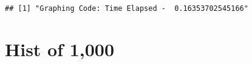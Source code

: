 \documentclass[
]{article}
\newenvironment{Shaded}{\begin{snugshade}}{\end{snugshade}}
\newcommand{\NormalTok}[1]{#1}
\newcommand{\OtherTok}[1]{\textcolor[rgb]{0.56,0.35,0.01}{#1}}
\newcommand{\SpecialCharTok}[1]{\textcolor[rgb]{0.81,0.36,0.00}{\textbf{#1}}}
\begin{document}
\begin{verbatim}
## [1] "Graphing Code: Time Elapsed -  0.16353702545166"
\end{verbatim}

\section{Hist of 1,000}\label{hist-of-1000}

\begin{Shaded}
\end{Shaded}
\end{document}
